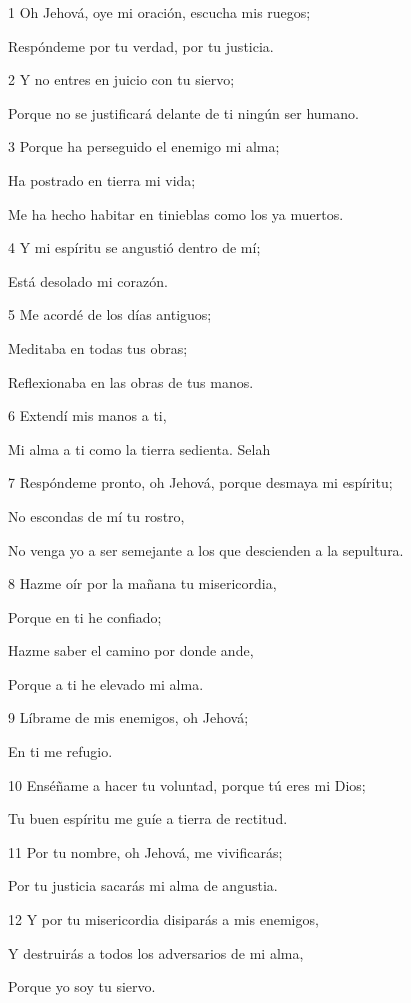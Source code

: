 \par 1 Oh Jehová, oye mi oración, escucha mis ruegos;
\par Respóndeme por tu verdad, por tu justicia.
\par 2 Y no entres en juicio con tu siervo;
\par Porque no se justificará delante de ti ningún ser humano.
\par 3 Porque ha perseguido el enemigo mi alma;
\par Ha postrado en tierra mi vida;
\par Me ha hecho habitar en tinieblas como los ya muertos.
\par 4 Y mi espíritu se angustió dentro de mí;
\par Está desolado mi corazón.
\par 5 Me acordé de los días antiguos;
\par Meditaba en todas tus obras;
\par Reflexionaba en las obras de tus manos.
\par 6 Extendí mis manos a ti,
\par Mi alma a ti como la tierra sedienta. Selah
\par 7 Respóndeme pronto, oh Jehová, porque desmaya mi espíritu;
\par No escondas de mí tu rostro,
\par No venga yo a ser semejante a los que descienden a la sepultura.
\par 8 Hazme oír por la mañana tu misericordia,
\par Porque en ti he confiado;
\par Hazme saber el camino por donde ande,
\par Porque a ti he elevado mi alma.
\par 9 Líbrame de mis enemigos, oh Jehová;
\par En ti me refugio.
\par 10 Enséñame a hacer tu voluntad, porque tú eres mi Dios;
\par Tu buen espíritu me guíe a tierra de rectitud.
\par 11 Por tu nombre, oh Jehová, me vivificarás;
\par Por tu justicia sacarás mi alma de angustia.
\par 12 Y por tu misericordia disiparás a mis enemigos,
\par Y destruirás a todos los adversarios de mi alma,
\par Porque yo soy tu siervo.


